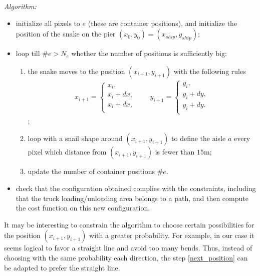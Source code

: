 \documentclass{article}
\begin{document}
\noindent
\textit{Algorithm:}
\begin{itemize}
	\item initialize all pixels to $ e $ (these are container positions), and initialize the position of the snake on the pier $ (x_0, y_0) = (x_ {ship}, y_ {ship}) $;

    \item  loop till $\#e>N_e$ whether the number of positions is sufficiently big:
    \begin{enumerate}
        \item\label{next_position} the snake moves to the position $(x_{i+1},y_{i+1})$ with the following rules
			\begin{eqnarray}
			x_{i+1} = \left\{\begin{array}{l}
			x_i, \\
			x_i + dx,\\
			x_i + dx, \\
			\end{array}\right. \qquad
			y_{i+1}	 = \left\{\begin{array}{l}
			y_i, \\
			y_i + dy,\\
			y_i + dy. \\
			\end{array}\right.
			\nonumber
			\end{eqnarray};
			 \item  loop with a snail shape around $(x_{i+1},y_{i+1})$ to define the aisle $a$ every pixel which distance from $(x_{i+1},y_{i+1})$ is fewer than $15$m; %
			\item  update the number of container positions $\#e$.
	\end{enumerate}
	\item check that the configuration obtained complies with the constraints, including that the truck loading/unloading area belongs to a path, and then compute the cost function on this new configuration.
\end{itemize}

It may be interesting to constrain the algorithm to choose certain possibilities for the position $ (x_ {i + 1}, y_ {i + 1}) $ with a greater probability. 
For example, in our case it seems logical to favor a straight line and avoid too many bends. 
Thus, instead of choosing with the same probability each direction, the step \ref{next_position} can be adapted to prefer the straight line.
\end{document}
